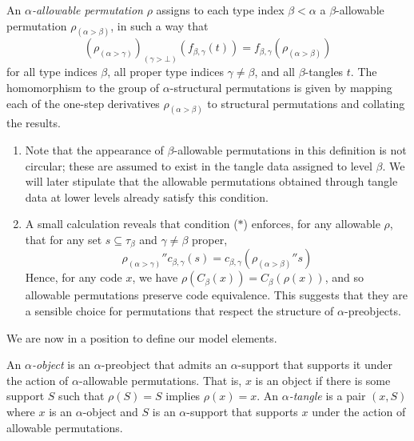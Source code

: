 \begin{definition}
    \label{def:allowable}
    An \emph{\( \alpha \)-allowable permutation} \( \rho \) assigns to each type index \( \beta < \alpha \) a \( \beta \)-allowable permutation \( \rho_{(\alpha > \beta)} \), in such a way that
    \begin{equation}
        (\rho_{(\alpha > \gamma)})_{(\gamma > \bot)}(f_{\beta,\gamma}(t)) = f_{\beta,\gamma}(\rho_{(\alpha > \beta)})
        \tag{\( \ast \)}
    \end{equation}
    for all type indices \( \beta \), all proper type indices \( \gamma \neq \beta \), and all \( \beta \)-tangles \( t \).
    The homomorphism to the group of \( \alpha \)-structural permutations is given by mapping each of the one-step derivatives \( \rho_{(\alpha > \beta)} \) to structural permutations and collating the results.
\end{definition}
\begin{remark}
    \begin{enumerate}
        \item Note that the appearance of \( \beta \)-allowable permutations in this definition is not circular; these are assumed to exist in the tangle data assigned to level \( \beta \).
        We will later stipulate that the allowable permutations obtained through tangle data at lower levels already satisfy this condition.
        \item A small calculation reveals that condition (\( \ast \)) enforces, for any allowable \( \rho \), that for any set \( s \subseteq \tau_\beta \) and \( \gamma \neq \beta \) proper, \[ {\rho_{(\alpha > \gamma)}} '' c_{\beta,\gamma}(s) = c_{\beta,\gamma}({\rho_{(\alpha > \beta)}} '' s) \]
        Hence, for any code \( x \), we have \( \rho(C_\beta(x)) = C_\beta(\rho(x)) \), and so allowable permutations preserve code equivalence.
        This suggests that they are a sensible choice for permutations that respect the structure of \( \alpha \)-preobjects.
    \end{enumerate}
\end{remark}

We are now in a position to define our model elements.

\begin{definition}
    An \emph{\( \alpha \)-object} is an \( \alpha \)-preobject that admits an \( \alpha \)-support that supports it under the action of \( \alpha \)-allowable permutations.
    That is, \( x \) is an object if there is some support \( S \) such that \( \rho(S) = S \) implies \( \rho(x) = x \).
    An \emph{\( \alpha \)-tangle} is a pair \( (x, S) \) where \( x \) is an \( \alpha \)-object and \( S \) is an \( \alpha \)-support that supports \( x \) under the action of allowable permutations.
\end{definition}

